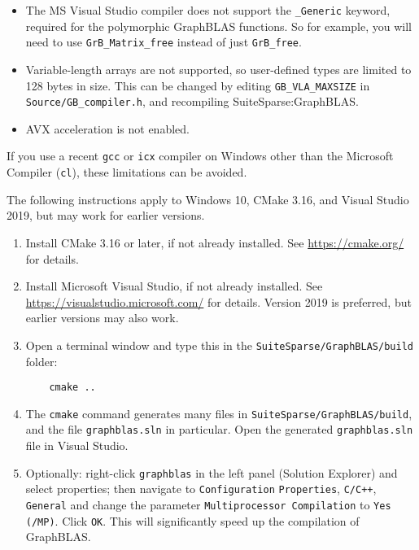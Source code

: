 \documentclass[12pt]{article}
\begin{document}
{\begin{itemize}
\item The MS Visual Studio compiler does not support the \verb'_Generic'
keyword, required for the polymorphic GraphBLAS functions.  So for example, you
will need to use \verb'GrB_Matrix_free' instead of just \verb'GrB_free'.

\item Variable-length arrays are not supported, so user-defined
types are limited to 128 bytes in size.  This can be changed by editing
\verb'GB_VLA_MAXSIZE' in \verb'Source/GB_compiler.h', and recompiling
SuiteSparse:GraphBLAS.

\item AVX acceleration is not enabled.
\end{itemize}

If you use a recent \verb'gcc' or \verb'icx' compiler on Windows other than the
Microsoft Compiler (\verb'cl'), these limitations can be avoided.

The following instructions apply to Windows 10, CMake 3.16, and
Visual Studio 2019, but may work for earlier versions.

\begin{enumerate}

\item Install CMake 3.16 or later, if not already installed.
    See \url{https://cmake.org/} for details.

\item Install Microsoft Visual Studio, if not already installed.
    See \url{https://visualstudio.microsoft.com/} for details.
    Version 2019 is preferred, but earlier versions may also work.

\item Open a terminal window and type this in the
    \verb'SuiteSparse/GraphBLAS/build' folder:

    \vspace{-0.1in}
    {\small
    \begin{verbatim}
    cmake ..  \end{verbatim} }
    \vspace{-0.1in}

\item The \verb'cmake' command generates many files in
    \verb'SuiteSparse/GraphBLAS/build', and the file \verb'graphblas.sln' in
    particular.  Open the generated \verb'graphblas.sln' file in Visual Studio.

\item Optionally: right-click \verb'graphblas' in the left panel (Solution
    Explorer) and select properties; then navigate to \verb'Configuration'
    \verb'Properties', \verb'C/C++', \verb'General' and change the parameter
    \verb'Multiprocessor Compilation' to \verb'Yes (/MP)'.  Click \verb'OK'.
    This will significantly speed up the compilation of GraphBLAS.


\end{enumerate}}
\end{document}
